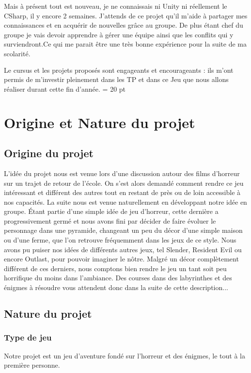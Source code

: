 \documentclass[12pt,a4paper]{article}
\begin{document}
	Mais à présent tout est nouveau, je ne connaissais ni Unity ni réellement le CSharp, il y encore 2 semaines. J'attends de ce projet qu'il m'aide à partager mes connaissances et en acquérir de nouvelles grâce au groupe. De plus étant chef du groupe je vais devoir apprendre à gérer une équipe ainsi que les conflits qui y surviendront.Ce qui me parait être une très bonne expérience pour la suite de ma scolarité.
	
	Le cursus et les projets proposés sont engageants et encourageants : ils m'ont permis de m'investir pleinement dans les TP et dans ce Jeu que nous allons réaliser durant cette fin d'année.
\baselineskip = 20 pt
\newpage
\section{Origine et Nature du projet}
\subsection{Origine du projet}
L'idée du projet nous est venue lors d'une discussion autour des films
d'horreur sur un trajet de retour de l'école. On s'est alors demandé comment rendre ce
jeu intéressant et différent des autres tout en restant de près ou de loin accessible à nos capacités.
La suite nous est venue naturellement en développant
notre idée en groupe. Étant partie d'une simple idée de jeu d'horreur, cette dernière a progressivement germé et
nous avons fini par décider de faire évoluer le personnage dans une pyramide, changeant un peu du
décor d'une simple maison ou d'une ferme, que l'on retrouve fréquemment dans les jeux de ce style.
Nous avons pu puiser nos idées de différents autres jeux, tel Slender, Resident Evil ou encore Outlast,
pour pouvoir imaginer le nôtre. Malgré un décor complètement différent de ces derniers, nous
comptons bien rendre le jeu un tant soit peu horrifique du moins dans l'ambiance.
Des courses dans des labyrinthes et des énigmes à résoudre vous attendent donc dans la suite de cette
description...

\newpage
\subsection{Nature du projet}
\subsubsection{Type de jeu}
Notre projet est un jeu d'aventure fondé sur l'horreur et des énigmes, le tout à la première personne.
\end{document}
